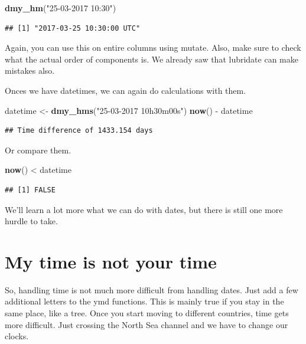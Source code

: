\documentclass[]{tufte-book}
\newenvironment{Shaded}{}{}
\newcommand{\KeywordTok}[1]{\textcolor[rgb]{0.00,0.44,0.13}{\textbf{#1}}}
\newcommand{\NormalTok}[1]{#1}
\newcommand{\OperatorTok}[1]{\textcolor[rgb]{0.40,0.40,0.40}{#1}}
\newcommand{\StringTok}[1]{\textcolor[rgb]{0.25,0.44,0.63}{#1}}
\begin{document}
\begin{Shaded}
\begin{Highlighting}[]
\KeywordTok{dmy_hm}\NormalTok{(}\StringTok{"25-03-2017 10:30"}\NormalTok{)}
\end{Highlighting}
\end{Shaded}

\begin{verbatim}
## [1] "2017-03-25 10:30:00 UTC"
\end{verbatim}

Again, you can use this on entire columns using mutate. Also, make sure to check what the actual order of components is. We already saw that lubridate can make mistakes also.

Onces we have datetimes, we can again do calculations with them.

\begin{Shaded}
\begin{Highlighting}[]
\NormalTok{datetime <-}\StringTok{ }\KeywordTok{dmy_hms}\NormalTok{(}\StringTok{"25-03-2017 10h30m00s"}\NormalTok{)}
\KeywordTok{now}\NormalTok{() }\OperatorTok{-}\StringTok{ }\NormalTok{datetime}
\end{Highlighting}
\end{Shaded}

\begin{verbatim}
## Time difference of 1433.154 days
\end{verbatim}

Or compare them.

\begin{Shaded}
\begin{Highlighting}[]
\KeywordTok{now}\NormalTok{() }\OperatorTok{<}\StringTok{ }\NormalTok{datetime}
\end{Highlighting}
\end{Shaded}

\begin{verbatim}
## [1] FALSE
\end{verbatim}

We'll learn a lot more what we can do with dates, but there is still one more hurdle to take.

\hypertarget{my-time-is-not-your-time}{%
\section{My time is not your time}\label{my-time-is-not-your-time}}

So, handling time is not much more difficult from handling dates. Just add a few additional letters to the ymd functions. This is mainly true if you stay in the same place, like a tree. Once you start moving to different countries, time gets more difficult. Just crossing the North Sea channel and we have to change our clocks.
\end{document}
